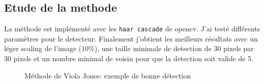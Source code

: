\documentclass{article}
\begin{document}
\subsection{Etude de la methode}
La méthode est implémenté avec les \texttt{haar cascade} de opencv. J'ai testé différents paramètres pour le detecteur. Finalement j'obtient les meilleurs résultats avec un léger scaling de l'image ($10\%$), une taille minimale de detection de 30 pixels par 30 pixels et un nombre minimal de voisin pour que la detection soit valide de 5.

\begin{figure}[h!]
  \centering
  \hfill

  \caption{Méthode de Viola Jones: exemple de bonne détection}
\end{figure}
\end{document}
